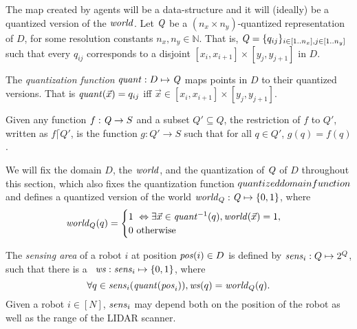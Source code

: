 The map created by agents will be a data-structure and it will (ideally) be a quantized version of the $\mathit{world}$.
Let $\mathit{Q}$ be a $(n_x\times n_y)$-quantized representation of $D$, for some resolution constants $n_x,n_y \in \mathbb{N}$. That is, $\mathit{Q} = \{q_{ij}\}_{i\in [1..n_x], j\in [1..n_y]}$
such that every $q_{ij}$ corresponds to a disjoint $[x_i, x_{i+1}] \times [y_j, y_{j+1}]$ in $D$.

\begin{definition}
    The \emph{quantization function}  $\mathit{quant}:D \mapsto \mathit{Q}$ maps points in $D$ to their quantized versions. 
    That is $\mathit{quant}(\Vec{x}) = q_{ij}$ iff $\Vec{x} \in [x_i, x_{i+1}] \times [y_j, y_{j+1}]$.
   \end{definition}

\begin{definition}
    Given any function $f:\mathit{Q} \rightarrow S$ and a subset $Q' \subseteq Q$, 
    the restriction of $f$ to $Q'$, written as $f \lceil Q'$, is the function
    $g:Q' \rightarrow S$ such that for all $q \in Q'$, $g(q) = f(q)$.
\end{definition}

We will fix the domain $D$, the $\mathit{world}$, and the quantization of $\mathit{Q}$ of $D$ throughout this section, which also fixes the quantization function $quantized domain function$ and defines a quantized version of the world $\mathit{world}_Q : \mathit{Q} \mapsto \left\{0,1\right\}$, where  
$$\mathit{world}_Q(q) = \begin{cases}
        1\ \Leftrightarrow \exists \Vec{x}\in \mathit{quant}^{-1}(q), \mathit{world}(\Vec{x}) = 1, \\
        0\ \mbox{otherwise}
\end{cases}
$$




\begin{definition}
    The \emph{sensing area} of a robot $i$ at position $\mathit{pos}(i)\in D$ is defined by $\mathit{sens}_i: Q \mapsto 2^{Q}$, such that there is a \qdfunc\ $\mathit{ws} : \mathit{sens}_i \mapsto \left\{0,1\right\}$, where $$\forall q \in \mathit{sens}_i(\mathit{quant}(\mathit{pos}_i)), \mathit{ws}(q) = \mathit{world}_Q(q).$$
    Given a robot $i \in [N]$, $\mathit{sens}_i$ may depend both on the position of the robot as well as the range of the LIDAR scanner.
\end{definition}



